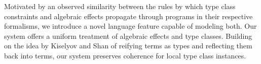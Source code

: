 Motivated by an observed similarity between the rules by which type class constraints and algebraic effects propagate through programs in their respective formalisms, we introduce a novel language feature capable of modeling both. Our system offers a uniform treatment of algebraic effects and type classes. Building on the idea by Kiselyov and Shan of reifying terms as types and reflecting them back into terms, our system preserves coherence for local type class instances.
